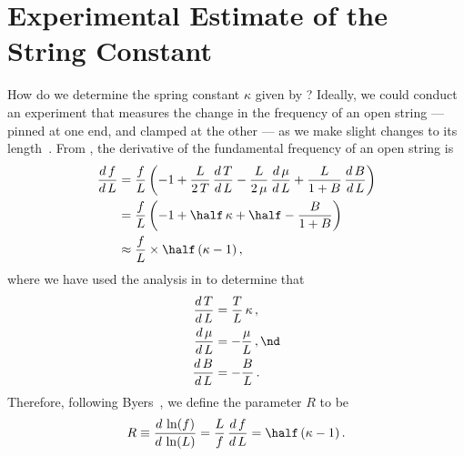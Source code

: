 %
%
%

 \section{Experimental Estimate of the String Constant\label{sct:exp}}

How do we determine the spring constant $\kappa$ given by ? Ideally, we could conduct an experiment that measures the change in the frequency of an open string --- pinned at one end, and clamped at the other --- as we make slight changes to its length~\cite{ref:byers1996cgi,ref:varieschi2010icf}. From , the derivative of the fundamental frequency of an open string is
 \begin{equation}
 \begin{split}
\frac{d\, f}{d\, L} &= \frac{f}{L} \left( -1 + \frac{L}{2\, T}\, \frac{d\, T}{d\, L} - \frac{L}{2\, \mu}\, \frac{d\, \mu}{d\, L} + \frac{L}{1 + B}\, \frac{d\, B}{d\, L} \right) \\
&= \frac{f}{L} \left( -1 + \half\, \kappa + \half - \frac{B}{1 + B} \right) \\
&\approx \frac{f}{L} \times \half\, (\kappa - 1)\, ,
 \end{split}
 \end{equation}
where we have used the analysis in  to determine that
 \begin{subequations}
 \begin{align}
\frac{d\, T}{d\, L} &= \frac{T}{L}\, \kappa\, , \\
\frac{d\, \mu}{d\, L} &= -\frac{\mu}{L}\, , \nd \\
\frac{d\, B}{d\, L} &= -\frac{B}{L}\, . \\
 \end{align}
 \end{subequations}
Therefore, following Byers~\cite{ref:byers1996cgi,ref:varieschi2010icf}, we define the parameter $R$ to be
 \begin{equation}\label{eqn:r_def}
R \equiv \frac{d\, \ln(f)}{d\, \ln(L)} = \frac{L}{f}\, \frac{d\, f}{d\, L} = \half\, (\kappa - 1)\, .
 \end{equation}


